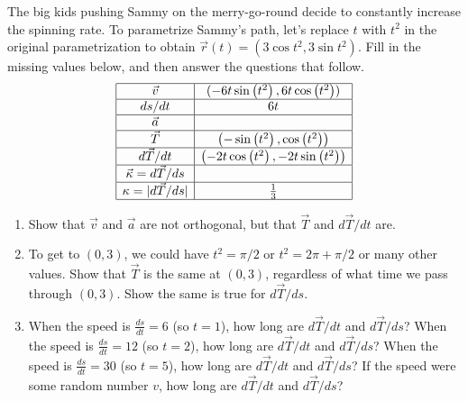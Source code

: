 \begin{problem}
 The big kids pushing Sammy on the merry-go-round decide to constantly increase the spinning rate.  To parametrize Sammy's path, let's replace $t$ with $t^2$ in the original parametrization to obtain $\vec r(t) = (3\cos t^2, 3\sin t^2)$. Fill in the missing values below, and then answer the questions that follow.
$$\begin{array}{|c|c|}\hline
 \vec v & ( -6 t \sin \left(t^2\right),6 t \cos \left(t^2\right) ) \\\hline
 ds/dt & 6 t \\\hline
 \vec a & %
   \\\hline
 \vec T & \left(-\sin \left(t^2\right),\cos \left(t^2\right)\right) 
\\\hline
 d\vec T/dt & \left(-2 t \cos \left(t^2\right),-2 t \sin \left(t^2\right)\right)\\\hline
 \vec \kappa = d\vec T/ds & %
\\\hline
 \kappa =|d\vec T/ds| & \frac{1}{3} \\\hline
\end{array}$$
\begin{enumerate}
 \item Show that $\vec v$ and $\vec a$ are not orthogonal, but that $\vec T$ and $d\vec T/dt$ are. 
 \item To get to $(0,3)$, we could have $t^2=\pi/2$ or $t^2=2\pi+\pi/2$ or many other values. Show that $\vec T$ is the same at $(0,3)$, regardless of what time we pass through $(0,3)$. Show the same is true for $d\vec T/ds$.
 \item When the speed is $\frac{ds}{dt}=6$ (so $t=1$), how long are $d\vec T/dt$ and $d\vec T/ds$? 
When the speed is $\frac{ds}{dt}=12$ (so $t=2$), how long are $d\vec T/dt$ and $d\vec T/ds$? 
When the speed is $\frac{ds}{dt}=30$ (so $t=5$), how long are $d\vec T/dt$ and $d\vec T/ds$? 
If the speed were some random number $v$, how long are $d\vec T/dt$ and $d\vec T/ds$? 
\end{enumerate}

\end{problem}

